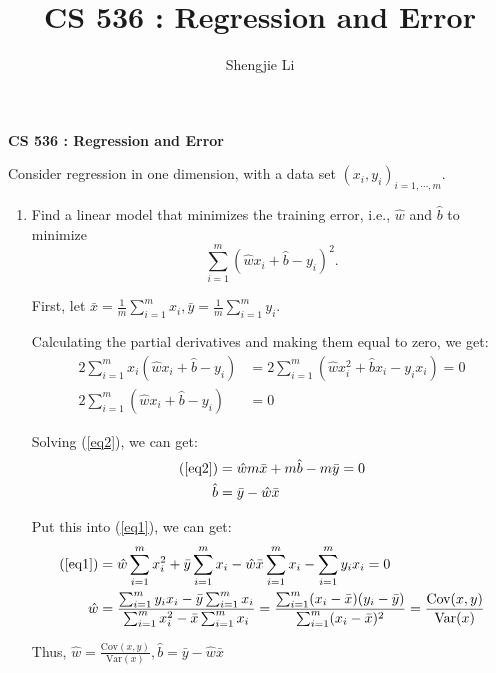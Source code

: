 \documentclass[letter, 12pt]{article}
\author{Shengjie Li}
\title{CS 536 : Regression and Error}
\begin{document}
    \centerline{\textbf{CS 536 : Regression and Error}}
    \par{Consider regression in one dimension, with a data set $ {(x_i , y_i )} _{i=1,\cdots,m} . $}
    \begin{enumerate}
    	\item{
    		Find a linear model that minimizes the training error, i.e., $ \hat{w} $ and $ \hat{b} $ to minimize
    		\[ \sum_{i=1}^{m}( \hat{w}x_i + \hat{b} - y_i )^2 . \]
    	}
    	\par{First, let $ \bar{x} = \frac{1}{m} \sum_{i=1}^{m} x_i, \bar{y} = \frac{1}{m} \sum_{i=1}^{m} y_i $.}
    	\par{Calculating the partial derivatives and making them equal to zero, we get:}
    	\begin{align}
    		2 \sum_{i=1}^{m} x_i(\hat{w}x_i + \hat{b} - y_i) &= 2 \sum_{i=1}^{m} (\hat{w}x_i^2 + \hat{b}x_i - y_ix_i) = 0 \label{eq1}\\
    		2 \sum_{i=1}^{m} (\hat{w}x_i + \hat{b} - y_i) &= 0 \label{eq2}
    	\end{align}
    	\par{Solving (\ref{eq2}), we can get:}
    	\begin{align*}
	    	(\ref{eq2}) &= \hat{w} m \bar{x}  + m \hat{b} -m \bar{y} = 0 \\
	    	\hat{b} &= \bar{y} - \hat{w} \bar{x}
    	\end{align*}
    	\par{Put this into (\ref{eq1}), we can get:}
    	\begin{align*}
	    	(\ref{eq1}) &= \hat{w} \sum_{i=1}^{m} x_i^2 + \bar{y} \sum_{i=1}^{m} x_i - \hat{w} \bar{x} \sum_{i=1}^{m} x_i - \sum_{i=1}^{m} y_i x_i = 0 \\
	    	\hat{w} &= \frac{\sum_{i=1}^{m} y_i x_i - \bar{y} \sum_{i=1}^{m} x_i}{\sum_{i=1}^{m} x_i^2 - \bar{x} \sum_{i=1}^{m} x_i} = \frac{\sum_{i=1}^{m} (x_i - \bar{x})(y_i - \bar{y})}{\sum_{i=1}^{m} (x_i - \bar{x})^2} = \frac{\text{Cov}(x, y)}{\text{Var}(x)}
    	\end{align*}
    	\par{Thus, $ \hat{w} = \frac{\text{Cov}(x, y)}{\text{Var}(x)}, \hat{b} = \bar{y} - \hat{w} \bar{x} $}
    \end{enumerate}
\end{document}
